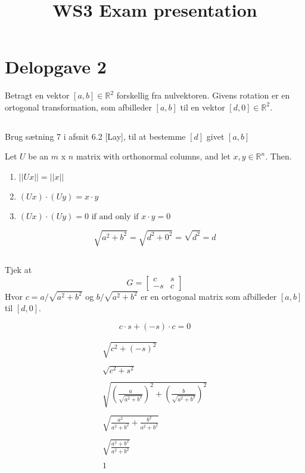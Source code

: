 \documentclass{article}
\title{WS3 Exam presentation}
\begin{document}
\section{Delopgave 2}
Betragt en vektor $[a,b] \in \mathbb{R}^2$ forskellig fra nulvektoren. Givens rotation er en ortogonal transformation, som afbilleder $[a,b]$ til en vektor $[d,0] \in \mathbb{R}^2$.

\subsection{}
Brug s\ae tning 7 i afsnit 6.2 [Lay], til at bestemme $[d]$ givet $[a,b]$

Let $U$ be an $m$ x $n$ matrix with orthonormal columns, and let $x, y \in \mathbb{R}^n$. Then.

\begin{enumerate}
    \item $||Ux|| = ||x||$
    \item $(Ux) \cdot (Uy) = x \cdot y$
    \item $(Ux) \cdot (Uy) = 0 \text{ if and only if } x \cdot y = 0$
\end{enumerate}

\begin{equation}
    \sqrt{a^2 + b^2} = \sqrt{d^2 + 0^2} = \sqrt{d^2} = d
\end{equation}

\subsection{}
Tjek at
\begin{equation}
    G =
    \begin{bmatrix}
        c & s \\
        -s & c
    \end{bmatrix}
\end{equation}
Hvor $c = a/\sqrt{a^2 + b^2}$ og $b/\sqrt{ a^2 + b^2 }$ er en ortogonal matrix som afbilleder $[a,b]$ til $[d,0]$.

\begin{equation}
    c \cdot s + (-s) \cdot c = 0
\end{equation}

\begin{equation}
    \begin{array}{c}
        \sqrt{c^2 + (-s)^2} \\\\
        \sqrt{c^2 + s^2} \\\\
        \sqrt{(\frac{a}{\sqrt{a^2+b^2}})^2 + (\frac{b}{\sqrt{a^2+b^2}})^2} \\\\
        \sqrt{\frac{a^2}{a^2+b^2} + \frac{b^2}{a^2+b^2}} \\\\
        \sqrt{\frac{a^2 + b^2}{a^2 + b^2}} \\\\
        1
    \end{array}
\end{equation}
\end{document}
